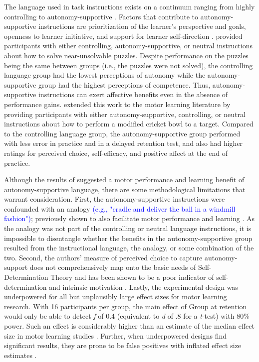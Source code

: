 \documentclass[man,floatsintext,donotrepeattitle,letterpaper,12pt]{apa7}
\begin{document}
The language used in task instructions exists on a continuum ranging from highly controlling to autonomy-supportive \autocite{reeve2009}. Factors that contribute to autonomy-supportive instructions are prioritization of the learner's perspective and goals, openness to learner initiative, and support for learner self-direction \autocite{reeve2009,reeve2011}. \textcite{reeve2011} provided participants with either controlling, autonomy-supportive, or neutral instructions about how to solve near-unsolvable puzzles. Despite performance on the puzzles being the same between groups (i.e., the puzzles were not solved), the controlling language group had the lowest perceptions of autonomy while the autonomy-supportive group had the highest perceptions of competence. Thus, autonomy-supportive instructions can exert affective benefits even in the absence of performance gains. \textcite{hooyman2014} extended this work to the motor learning literature by providing participants with either autonomy-supportive, controlling, or neutral instructions about how to perform a modified cricket bowl to a target. Compared to the controlling language group, the autonomy-supportive group performed with less error in practice and in a delayed retention test, and also had higher ratings for perceived choice, self-efficacy, and positive affect at the end of practice.

Although the results of \textcite{hooyman2014} suggested a motor performance and learning benefit of autonomy-supportive language, there are some methodological limitations that warrant consideration. First, the autonomy-supportive instructions were confounded with an analogy \textcolor{blue}{(e.g., "cradle and deliver the ball in a windmill fashion")}; previously shown to also facilitate motor performance and learning \autocites[e.g., ][]{liao2001}[see][for a review]{masters2020}. As the analogy was not part of the controlling or neutral language instructions, it is impossible to disentangle whether the benefits in the autonomy-supportive group resulted from the instructional language, the analogy, or some combination of the two. Second, the authors' measure of perceived choice to capture autonomy-support does not comprehensively map onto the basic needs of Self-Determination Theory \autocite{mcdonough2007,ng2011,ryan2020} and has been shown to be a poor indicator of self-determination and intrinsic motivation \autocite{reeve2003}. Lastly, the experimental design was underpowered for all but unplausibly large effect sizes for motor learning research. With 16 participants per group, the main effect of Group at retention would only be able to detect \emph{f} of 0.4 (equivalent to \emph{d} of .8 for a \emph{t}-test) with 80\% power. Such an effect is considerably higher than an estimate of the median effect size in motor learning studies \autocite[$d = 0.63$,][]{lohse2016}. Further, when underpowered designs find significant results, they are prone to be false positives with inflated effect size estimates \autocite{button2013,simmons2011}.
\end{document}
